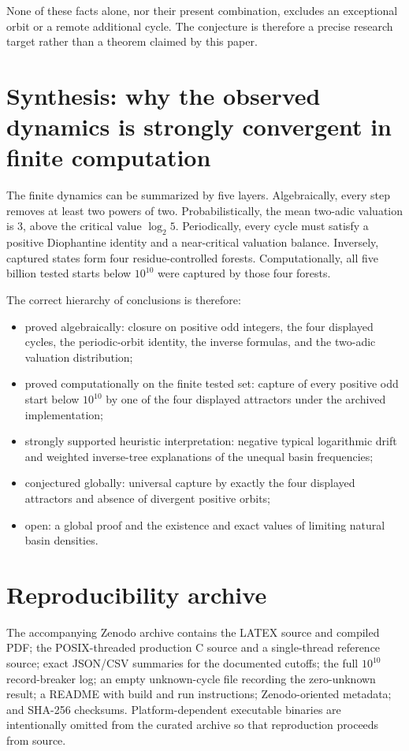\documentclass[11pt]{article}
\begin{document}
None of these facts alone, nor their present combination, excludes an exceptional orbit or a remote additional cycle. The conjecture is therefore a precise research target rather than a theorem claimed by this paper.

\section{Synthesis: why the observed dynamics is strongly convergent in finite computation}
The finite dynamics can be summarized by five layers. Algebraically, every step removes at least two powers of two. Probabilistically, the mean two-adic valuation is $3$, above the critical value $\log_2 5$. Periodically, every cycle must satisfy a positive Diophantine identity and a near-critical valuation balance. Inversely, captured states form four residue-controlled forests. Computationally, all five billion tested starts below $10^{10}$ were captured by those four forests.

The correct hierarchy of conclusions is therefore:
\begin{itemize}
\item proved algebraically: closure on positive odd integers, the four displayed cycles, the periodic-orbit identity, the inverse formulas, and the two-adic valuation distribution;
\item proved computationally on the finite tested set: capture of every positive odd start below $10^{10}$ by one of the four displayed attractors under the archived implementation;
\item strongly supported heuristic interpretation: negative typical logarithmic drift and weighted inverse-tree explanations of the unequal basin frequencies;
\item conjectured globally: universal capture by exactly the four displayed attractors and absence of divergent positive orbits;
\item open: a global proof and the existence and exact values of limiting natural basin densities.
\end{itemize}

\section{Reproducibility archive}
The accompanying Zenodo archive contains the LATEX source and compiled PDF; the POSIX-threaded production C source and a single-thread reference source; exact JSON/CSV summaries for the documented cutoffs; the full $10^{10}$ record-breaker log; an empty unknown-cycle file recording the zero-unknown result; a README with build and run instructions; Zenodo-oriented metadata; and SHA-256 checksums. Platform-dependent executable binaries are intentionally omitted from the curated archive so that reproduction proceeds from source.
\end{document}
